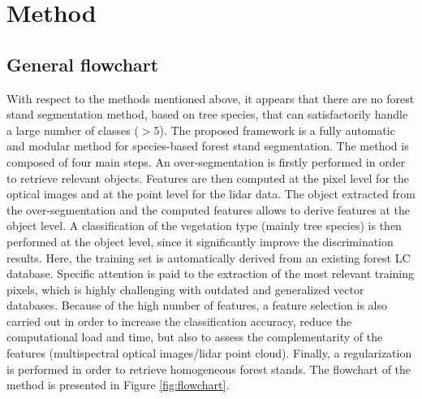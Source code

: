
\chapter{Method} %
\label{Chapter2} %

\startcontents[chapters]
\Mprintcontents





\section{General flowchart}

With respect to the methods mentioned above, it appears that there are no forest stand segmentation method, based on tree species, that can satisfactorily handle a large number of classes ($>$5). The proposed framework is a fully automatic and modular method for species-based forest stand segmentation. The method is composed of four main steps. An over-segmentation is firstly performed in order to retrieve relevant objects. Features are then computed at the pixel level for the optical images and at the point level for the lidar data. The object extracted from the over-segmentation and the computed features allows to derive features at the object level. A classification of the vegetation type (mainly tree species) is then performed at the object level, since it significantly improve the discrimination results. Here, the training set is automatically derived from an existing forest LC database. Specific attention is paid to the extraction of the most relevant training pixels, which is highly challenging with outdated and generalized vector databases. Because of the high number of features, a feature selection is also carried out in order to increase the classification accuracy, reduce the computational load and time, but also to assess the complementarity of the features (multispectral optical images/lidar point cloud). Finally, a regularization is performed in order to retrieve homogeneous forest stands. The flowchart of the method is presented in Figure \ref{fig:flowchart}.

